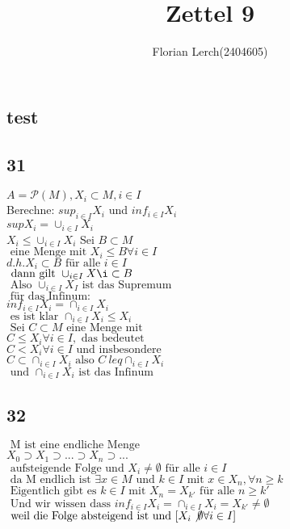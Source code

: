 \documentclass[11pt]{amsart}
\title{Zettel 9}
\author{Florian Lerch(2404605)}
\begin{document}
\subsection*{test}
\subsection*{31}
    \(A = \mathcal{P}(M), X_i \subset M, i \in I\) \\
    Berechne: \(sup_{i\in I}X_i\) und \(inf_{i\in I}X_i\) \\
    \(sup X_i = \cup_{i\in I}X_i \) \\
    \(X_i \leq \cup_{i\in I}X_i\) Sei \(B \subset M \)\\
    \(\mbox{ eine Menge mit } X_i \leq B \forall i \in I\) \\
    \(d.h. X_i \subset B \mbox{ für alle } i \in I \)\\
    \(\mbox{ dann gilt } \cup_{i \in I}X\i \subset B \)\\
    \(\mbox{ Also } \cup_{i\in I}X_I \mbox{ ist das Supremum } \)\\
    \(\mbox{ für das Infinum: } \)\\
    \(inf_{i \in I} X_i = \cap_{i \in I}X_i \)\\
    \(\mbox{ es ist klar } \cap_{i \in I}X_i \leq X_i \)\\
    \(\mbox{ Sei } C \subset M \mbox{ eine Menge mit }\) \\
    \( C \leq X_i \forall i \in I, \mbox{ das bedeutet }\) \\
    \( C < X_i \forall i \in I \mbox{ und insbesondere }\) \\
\(    C \subset \cap_{i\in I}X_i \mbox{ also } C \ leq \cap_{i \in I} X_i \)\\
\(    \mbox{ und } \cap_{i \in I}X_i \mbox{ ist das Infinum } \)
    \subsection*{32}
\(    \mbox{ M ist eine endliche Menge } \) \\
\(    X_0 \supset X_1 \supset ... \supset X_n \supset ... \)\\
\(    \mbox{ aufsteigende Folge und } X_i \not = \emptyset \mbox{ für alle } i \in I \)\\
\(    \mbox{ da M endlich ist } \exists x \in M \mbox{ und } k \in I \mbox{ mit } x \in X_n, \forall n \geq k \)\\
\(    \mbox{ Eigentlich gibt es } k \in I \mbox{ mit }X_n = X_{k'} \mbox{ für alle }n\geq k' \)\\
\(    \mbox{ Und wir wissen dass }inf_{i \in I} X_i = \cap_{i \in I} X_i = X_{k'} \not = \emptyset \)\\
\(    \mbox{ weil die Folge absteigend ist und } [X_i \not \emptyset \forall i \in I ]\)
\end{document}
